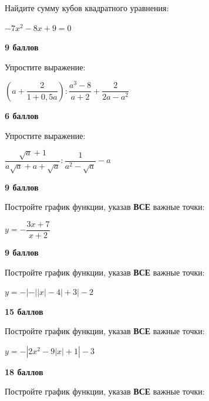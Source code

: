  Найдите сумму кубов квадратного уравнения:

$-7x^2 - 8x + 9 = 0$


\begin{flushright} \textbf{9 баллов}\\ 
\end{flushright}

\newpage

 Упростите выражение:

$\left(a+\dfrac{2}{1+0,5 a}\right): \dfrac{a^3-8}{a+2}+\dfrac{2}{2 a-a^2}$

\begin{flushright} \textbf{6 баллов}\\ 
\end{flushright}

 Упростите выражение:

$\dfrac{\sqrt{a}+1}{a \sqrt{a}+a+\sqrt{a}}: \dfrac{1}{a^2-\sqrt{a}}-a$

\begin{flushright} \textbf{9 баллов}\\ 
\end{flushright}


 Постройте график функции, указав \textbf{ВСЕ} важные точки:

$y=-\dfrac{3x+7}{x+2}$

\begin{flushright} \textbf{9 баллов}\\ 
\end{flushright}

 Постройте график функции, указав \textbf{ВСЕ} важные точки:

$y=-\left|-\left|\left|x\right|-4\right|+3\right|-2$

\begin{flushright} \textbf{15 баллов}\\ 
\end{flushright}

 Постройте график функции, указав \textbf{ВСЕ} важные точки:

$y=-\left|2x^{2}-9\left|x\right|+1\right|-3$

\begin{flushright} \textbf{18 баллов}\\ 
\end{flushright}

 Постройте график функции, указав \textbf{ВСЕ} важные точки:

